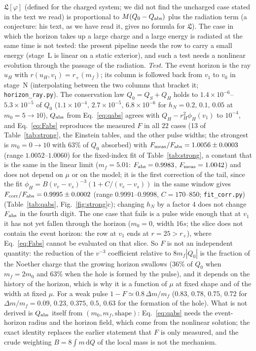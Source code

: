 \documentclass[11pt]{article}
\begin{document}
$\mathfrak L[\varphi]$ (defined for the charged system; we did not find the uncharged case stated in the text we read) is proportional to $M(Q_0-Q_{\rm abs})$ plus the radiation term (a conjecture: his text, as we have read it, gives no formula for $\mathfrak L$). The case in which the horizon takes up a large charge and a large energy is radiated at the same time is not tested: the present pipeline needs the row to carry a small energy (stage~L is linear on a static exterior), and such a test needs a nonlinear evolution through the passage of the radiation. \emph{Test.} The event horizon is the ray $u_H$ with $r(u_H,v_1)=r_+(m_f)$; its column is followed back from $v_1$ to $v_0$ in stage~N (interpolating between the two columns that bracket it; \texttt{horizon\_ray.py}). The conservation law $Q_0=Q_S+Q_H$ holds to $1.4\times10^{-6}$--$5.3\times10^{-5}$ of $Q_0$ ($1.1\times10^{-4},\,2.7\times10^{-5},\,6.8\times10^{-6}$ for $h_N=0.2,\,0.1,\,0.05$ at $m_0=5\to10$), $Q_{\rm abs}$ from Eq.~\eqref{eq:qabs} agrees with $Q_H-r_H^{2}\phi_H(v_1)$ to $10^{-4}$, and Eq.~\eqref{eq:Fabs} reproduces the measured $F$ in all $22$ cases (13 of Table~\ref{tab:strong}, the Einstein tables, and the other pulse widths; the strongest is $m_0=0\to10$ with $63\%$ of $Q_0$ absorbed) with $F_{\rm meas}/F_{\rm abs}=1.0056\pm0.0003$ (range $1.0052$--$1.0060$) for the fixed-index fit of Table~\ref{tab:strong}, a constant that is the same in the linear limit ($m_f=5.01$: $F_{\rm abs}=0.9983$, $F_{\rm meas}=1.0042$) and does not depend on $\mu$ or on the model; it is the first correction of the tail, since the fit $\phi_H=B(v_e-v_s)^{-3}(1+C/(v_e-v_s))$ in the same window gives $F_{\rm corr}/F_{\rm abs}=0.9995\pm0.0002$ (range $0.9991$--$0.9998$, $C=170$--$850$; \texttt{fit\_corr.py}) (Table~\ref{tab:qabs}, Fig.~\ref{fig:strong}c); changing $h_N$ by a factor $4$ does not change $F_{\rm abs}$ in the fourth digit. The one case that fails is a pulse wide enough that at $v_1$ it has not yet fallen through the horizon ($m_0=0$, width $16s$; the slice does not contain the event horizon: the row at $v_1$ ends at $r=25>r_+$), where Eq.~\eqref{eq:Fabs} cannot be evaluated on that slice. So $F$ is not an independent quantity: the reduction of the $v^{-3}$ coefficient relative to $8m_f|Q_0|$ is the fraction of the Noether charge that the growing horizon swallows ($36\%$ of $Q_0$ when $m_f=2m_0$ and $63\%$ when the hole is formed by the pulse), and it depends on the history of the horizon, which is why it is a function of $\mu$ at fixed shape and of the width at fixed $\mu$. For a weak pulse $1-F\simeq0.8\,\Delta m/m_f$ ($0.83,\,0.78,\,0.75,\,0.72$ for $\Delta m/m_f=0.09,\,0.23,\,0.375,\,0.5$, $0.63$ for the formation of the hole). What is not derived is $Q_{\rm abs}$ itself from $(m_0,m_f,\text{shape})$: Eq.~\eqref{eq:qabs} needs the event-horizon radius and the horizon field, which come from the nonlinear solution; the exact identity replaces the earlier statement that $F$ is only measured, and the crude weighting $B=8\int m\,\mathrm dQ$ of the local mass is not the mechanism.
\end{document}
